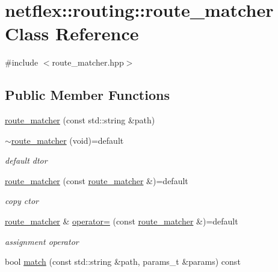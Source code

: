 \hypertarget{classnetflex_1_1routing_1_1route__matcher}{}\section{netflex\+:\+:routing\+:\+:route\+\_\+matcher Class Reference}
\label{classnetflex_1_1routing_1_1route__matcher}


{\ttfamily \#include $<$route\+\_\+matcher.\+hpp$>$}

\subsection*{Public Member Functions}
\begin{DoxyCompactItemize}
\item 
\hyperlink{classnetflex_1_1routing_1_1route__matcher_a9cf8d8ed16becad2d6952f66caed18c0}{route\+\_\+matcher} (const std\+::string \&path)
\item 
\mbox{\label{classnetflex_1_1routing_1_1route__matcher_abcdf35590451a74142de94f4899b6f0f}} 
\hyperlink{classnetflex_1_1routing_1_1route__matcher_abcdf35590451a74142de94f4899b6f0f}{$\sim$route\+\_\+matcher} (void)=default
\begin{DoxyCompactList}\small\item\em default dtor \end{DoxyCompactList}\item 
\mbox{\label{classnetflex_1_1routing_1_1route__matcher_a684097e48fdf58790bfa7d5325b0dfa2}} 
\hyperlink{classnetflex_1_1routing_1_1route__matcher_a684097e48fdf58790bfa7d5325b0dfa2}{route\+\_\+matcher} (const \hyperlink{classnetflex_1_1routing_1_1route__matcher}{route\+\_\+matcher} \&)=default
\begin{DoxyCompactList}\small\item\em copy ctor \end{DoxyCompactList}\item 
\mbox{\label{classnetflex_1_1routing_1_1route__matcher_aa0d6e82c9d745efc6d2dd16afa4415c4}} 
\hyperlink{classnetflex_1_1routing_1_1route__matcher}{route\+\_\+matcher} \& \hyperlink{classnetflex_1_1routing_1_1route__matcher_aa0d6e82c9d745efc6d2dd16afa4415c4}{operator=} (const \hyperlink{classnetflex_1_1routing_1_1route__matcher}{route\+\_\+matcher} \&)=default
\begin{DoxyCompactList}\small\item\em assignment operator \end{DoxyCompactList}\item 
bool \hyperlink{classnetflex_1_1routing_1_1route__matcher_ac0833b3f5d97b427ca9cc35ff95b477b}{match} (const std\+::string \&path, params\+\_\+t \&params) const
\end{DoxyCompactItemize}
